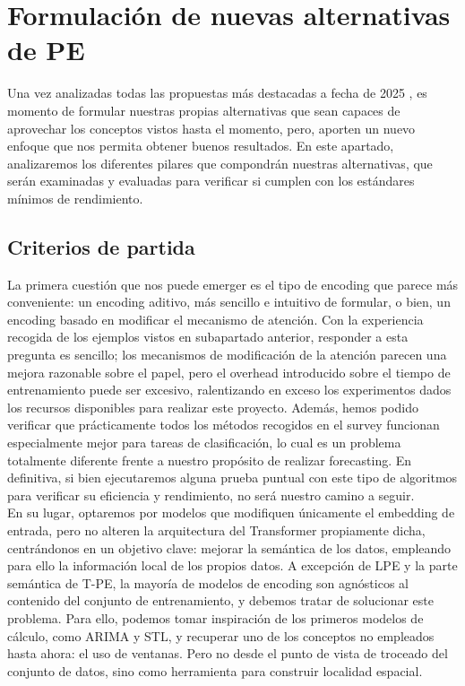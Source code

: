 \section{Formulación de nuevas alternativas de PE}

Una vez analizadas todas las propuestas más destacadas a fecha de 2025 \cite{irani2025positionalencodingtransformerbasedtime}, es momento de formular nuestras propias alternativas que sean capaces de aprovechar los conceptos vistos hasta el momento, pero, aporten un nuevo enfoque que nos permita obtener buenos resultados. En este apartado, analizaremos los diferentes pilares que compondrán nuestras alternativas, que serán examinadas y evaluadas para verificar si cumplen con los estándares mínimos de rendimiento.

\subsection{Criterios de partida}

La primera cuestión que nos puede emerger es el tipo de encoding que parece más conveniente: un encoding aditivo, más sencillo e intuitivo de formular, o bien, un encoding basado en modificar el mecanismo de atención. Con la experiencia recogida de los ejemplos vistos en subapartado anterior, responder a esta pregunta es sencillo; los mecanismos de modificación de la atención parecen una mejora razonable sobre el papel, pero el overhead introducido sobre el tiempo de entrenamiento puede ser excesivo, ralentizando en exceso los experimentos dados los recursos disponibles para realizar este proyecto. Además, hemos podido verificar que prácticamente todos los métodos recogidos en el survey funcionan especialmente mejor para tareas de clasificación, lo cual es un problema totalmente diferente frente a nuestro propósito de realizar forecasting. En definitiva, si bien ejecutaremos alguna prueba puntual con este tipo de algoritmos para verificar su eficiencia y rendimiento, no será nuestro camino a seguir.\\

En su lugar, optaremos por modelos que modifiquen únicamente el embedding de entrada, pero no alteren la arquitectura del Transformer propiamente dicha, centrándonos en un objetivo clave: mejorar la semántica de los datos, empleando para ello la información local de los propios datos. A excepción de LPE y la parte semántica de T-PE, la mayoría de modelos de encoding son agnósticos al contenido del conjunto de entrenamiento, y debemos tratar de solucionar este problema. Para ello, podemos tomar inspiración de los primeros modelos de cálculo, como ARIMA y STL, y recuperar uno de los conceptos no empleados hasta ahora: el uso de ventanas. Pero no desde el punto de vista de troceado del conjunto de datos, sino como herramienta para construir localidad espacial.\\

